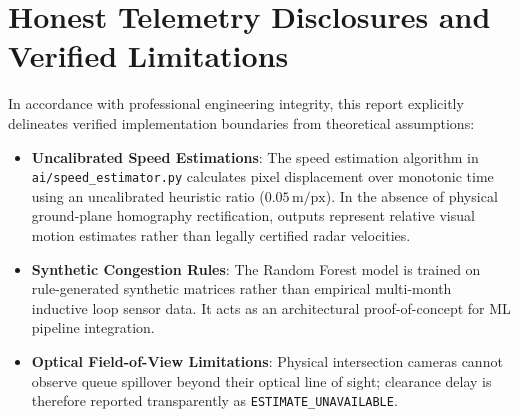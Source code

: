 \section{Honest Telemetry Disclosures and Verified Limitations}
In accordance with professional engineering integrity, this report explicitly delineates verified implementation boundaries from theoretical assumptions:
\begin{itemize}[leftmargin=*]
    \item \textbf{Uncalibrated Speed Estimations}: The speed estimation algorithm in \texttt{ai/speed\_estimator.py} calculates pixel displacement over monotonic time using an uncalibrated heuristic ratio ($0.05\,\text{m/px}$). In the absence of physical ground-plane homography rectification, outputs represent relative visual motion estimates rather than legally certified radar velocities.
    \item \textbf{Synthetic Congestion Rules}: The Random Forest model is trained on rule-generated synthetic matrices rather than empirical multi-month inductive loop sensor data. It acts as an architectural proof-of-concept for ML pipeline integration.
    \item \textbf{Optical Field-of-View Limitations}: Physical intersection cameras cannot observe queue spillover beyond their optical line of sight; clearance delay is therefore reported transparently as \texttt{ESTIMATE\_UNAVAILABLE}.
\end{itemize}
